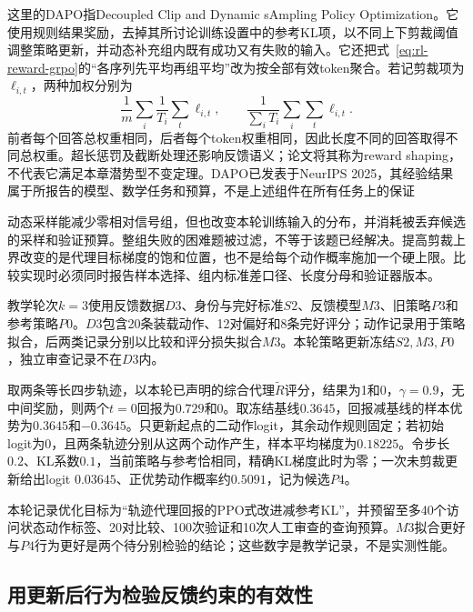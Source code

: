 这里的DAPO指Decoupled Clip and Dynamic sAmpling Policy Optimization。它使用规则结果奖励，去掉其所讨论训练设置中的参考KL项，以不同上下剪裁阈值调整策略更新，并动态补充组内既有成功又有失败的输入。它还把式~\eqref{eq:rl-reward-grpo}的“各序列先平均再组平均”改为按全部有效token聚合。若记剪裁项为$\ell_{i,t}$，两种加权分别为
\begin{equation}
  \frac1m\sum_i\frac1{T_i}\sum_t\ell_{i,t},
  \qquad
  \frac1{\sum_iT_i}\sum_i\sum_t\ell_{i,t}.
  \label{eq:rl-reward-dapo-weight}
\end{equation}
前者每个回答总权重相同，后者每个token权重相同，因此长度不同的回答取得不同总权重。超长惩罚及截断处理还影响反馈语义；论文将其称为reward shaping，不代表它满足本章潜势型不变定理。DAPO已发表于NeurIPS 2025，其经验结果属于所报告的模型、数学任务和预算，不是上述组件在所有任务上的保证

动态采样能减少零相对信号组，但也改变本轮训练输入的分布，并消耗被丢弃候选的采样和验证预算。整组失败的困难题被过滤，不等于该题已经解决。提高剪裁上界改变的是代理目标梯度的饱和位置，也不是给每个动作概率施加一个硬上限。比较实现时必须同时报告样本选择、组内标准差口径、长度分母和验证器版本。

\begin{example}[一轮可复查的更新记录]
  \label{ex:rl-reward-round}
  教学轮次$k=3$使用反馈数据$D3$、身份与完好标准$S2$、反馈模型$M3$、旧策略$P3$和参考策略$P0$。$D3$包含20条装载动作、12对偏好和8条完好评分；动作记录用于策略拟合，后两类记录分别以比较和评分损失拟合$M3$。本轮策略更新冻结$S2,M3,P0$，独立审查记录不在$D3$内。

  取两条等长四步轨迹，以本轮已声明的综合代理$\widetilde R$评分，结果为1和0，$\gamma=0.9$，无中间奖励，则两个$t=0$回报为$0.729$和0。取冻结基线$0.3645$，回报减基线的样本优势为$0.3645$和$-0.3645$。只更新起点的二动作logit，其余动作规则固定；若初始logit为0，且两条轨迹分别从这两个动作产生，样本平均梯度为$0.18225$。令步长$0.2$、KL系数$0.1$，当前策略与参考恰相同，精确KL梯度此时为零；一次未剪裁更新给出logit $0.03645$、正优势动作概率约$0.5091$，记为候选$P4$。

  本轮记录优化目标为“轨迹代理回报的PPO式改进减参考KL”，并预留至多40个访问状态动作标签、20对比较、100次验证和10次人工审查的查询预算。$M3$拟合更好与$P4$行为更好是两个待分别检验的结论；这些数字是教学记录，不是实测性能。
\end{example}

\subsection{用更新后行为检验反馈约束的有效性}
\label{sec:rl-reward-loop-check}

